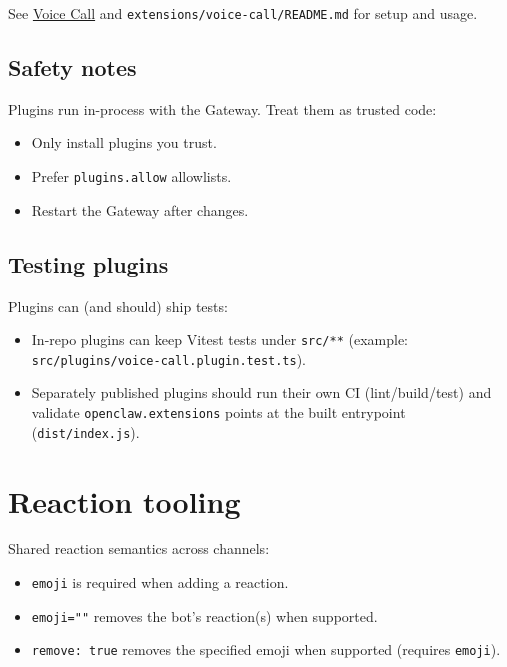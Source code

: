 See \href{/plugins/voice-call}{Voice Call} and \texttt{extensions/voice-call/README.md} for setup and usage.

\subsection{Safety notes}


Plugins run in-process with the Gateway. Treat them as trusted code:

\begin{itemize}
  \item Only install plugins you trust.
  \item Prefer \texttt{plugins.allow} allowlists.
  \item Restart the Gateway after changes.
\end{itemize}


\subsection{Testing plugins}


Plugins can (and should) ship tests:

\begin{itemize}
  \item In-repo plugins can keep Vitest tests under \texttt{src/**} (example: \texttt{src/plugins/voice-call.plugin.test.ts}).
  \item Separately published plugins should run their own CI (lint/build/test) and validate \texttt{openclaw.extensions} points at the built entrypoint (\texttt{dist/index.js}).
\end{itemize}



\clearpage

\section{Reaction tooling}


Shared reaction semantics across channels:

\begin{itemize}
  \item \texttt{emoji} is required when adding a reaction.
  \item \texttt{emoji=""} removes the bot's reaction(s) when supported.
  \item \texttt{remove: true} removes the specified emoji when supported (requires \texttt{emoji}).
\end{itemize}


